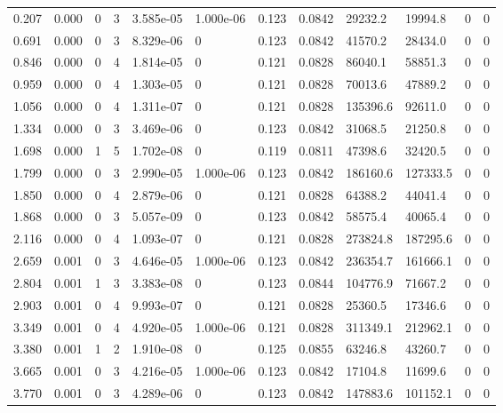 \documentclass[preview]{standalone}
\begin{document}
{{\begin{tabular}{L{1.2cm}C{1.2cm} C{0.3cm}C{0.5cm} C{1.4cm}C{1.4cm} C{1.4cm}C{1.4cm} C{1.6cm}C{1.6cm} C{1.6cm}C{1.6cm}}
  0.207  &  0.000  & 0     &  3 &  3.585e-05  & 1.000e-06  &  0.123&   0.0842& 29232.2 & 19994.8   &  0 & 0  \\ 
  0.691  &  0.000  & 0     &  3 &  8.329e-06  & 0  &  0.123&   0.0842& 41570.2 & 28434.0   &  0 & 0  \\ 
  0.846  &  0.000  & 0     &  4 &  1.814e-05  & 0  &  0.121&   0.0828& 86040.1 & 58851.3   &  0 & 0  \\ 
  0.959  &  0.000  & 0     &  4 &  1.303e-05  & 0  &  0.121&   0.0828& 70013.6 & 47889.2   &  0 & 0  \\ 
  1.056  &  0.000  & 0     &  4 &  1.311e-07  & 0  &  0.121&   0.0828& 135396.6 & 92611.0   &  0 & 0  \\ 
  1.334  &  0.000  & 0     &  3 &  3.469e-06  & 0  &  0.123&   0.0842& 31068.5 & 21250.8   &  0 & 0  \\ 
  1.698  &  0.000  & 1     &  5 &  1.702e-08  & 0  &  0.119&   0.0811& 47398.6 & 32420.5   &  0 & 0  \\ 
  1.799  &  0.000  & 0     &  3 &  2.990e-05  & 1.000e-06  &  0.123&   0.0842& 186160.6 & 127333.5   &  0 & 0  \\ 
  1.850  &  0.000  & 0     &  4 &  2.879e-06  & 0  &  0.121&   0.0828& 64388.2 & 44041.4   &  0 & 0  \\ 
  1.868  &  0.000  & 0     &  3 &  5.057e-09  & 0  &  0.123&   0.0842& 58575.4 & 40065.4   &  0 & 0  \\ 
  2.116  &  0.000  & 0     &  4 &  1.093e-07  & 0  &  0.121&   0.0828& 273824.8 & 187295.6   &  0 & 0  \\ 
  2.659  &  0.001  & 0     &  3 &  4.646e-05  & 1.000e-06  &  0.123&   0.0842& 236354.7 & 161666.1   &  0 & 0  \\ 
  2.804  &  0.001  & 1     &  3 &  3.383e-08  & 0  &  0.123&   0.0844& 104776.9 & 71667.2   &  0 & 0  \\ 
  2.903  &  0.001  & 0     &  4 &  9.993e-07  & 0  &  0.121&   0.0828& 25360.5 & 17346.6   &  0 & 0  \\ 
  3.349  &  0.001  & 0     &  4 &  4.920e-05  & 1.000e-06  &  0.121&   0.0828& 311349.1 & 212962.1   &  0 & 0  \\ 
  3.380  &  0.001  & 1     &  2 &  1.910e-08  & 0  &  0.125&   0.0855& 63246.8 & 43260.7   &  0 & 0  \\ 
  3.665  &  0.001  & 0     &  3 &  4.216e-05  & 1.000e-06  &  0.123&   0.0842& 17104.8 & 11699.6   &  0 & 0  \\ 
  3.770  &  0.001  & 0     &  3 &  4.289e-06  & 0  &  0.123&   0.0842& 147883.6 & 101152.1   &  0 & 0  \\ 

\end{tabular}}}
\end{document}
